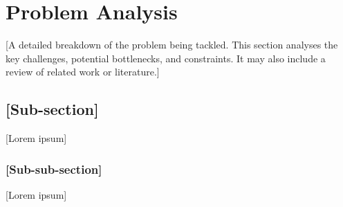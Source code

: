 \chapter{Problem Analysis}
\label{chap:problem_analysis}

[A detailed breakdown of the problem being tackled. This section analyses the key challenges, potential bottlenecks, and constraints. It may also include a review of related work or literature.]

\section{[Sub-section]}
\label{sec:problem_analysis_subsection}
[Lorem ipsum]

\subsection{[Sub-sub-section]}
\label{subsec:problem_analysis_subsubsection}
[Lorem ipsum]

